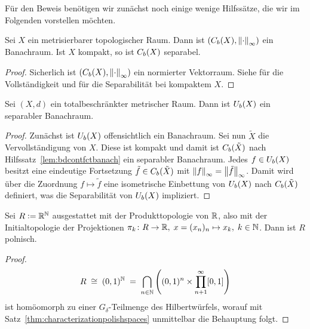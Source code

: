 \documentclass[../main/main.tex]{subfiles}
\begin{document}
	Für den Beweis benötigen wir zunächst noch einige wenige Hilfssätze, die wir im Folgenden vorstellen möchten.
	
	\begin{Hilfssatz}
		\label{lem:bdcontfctbanach}
		Sei $X$ ein metrisierbarer topologischer Raum. Dann ist $(C_b(X), \left\lVert\cdot\right\rVert_\infty)$ ein Banachraum. Ist $X$ kompakt, so ist $C_b(X)$ separabel.
	\end{Hilfssatz}

	\begin{proof}
		Sicherlich ist $(C_b(X), \left\lVert\cdot\right\rVert_\infty)$ ein normierter Vektorraum. Siehe \cite[Satz 2.1.6]{Simon.2015} für die Vollständigkeit und
		\cite[Satz 2.3.7]{Simon.2015} für die Separabilität bei kompaktem $X$.
	\end{proof}
	
	\begin{Hilfssatz}
		\label{lem:bduniffctbanach}
		Sei $(X, d)$ ein totalbeschränkter metrischer Raum. Dann ist $U_b(X)$ ein separabler Banachraum.
	\end{Hilfssatz}
	
	\begin{proof}
		Zunächst ist $U_b(X)$ offensichtlich ein Banachraum.
		Sei nun $\tilde{X}$ die Vervollständigung von $X$. Diese ist kompakt und damit ist $C_b(\tilde{X})$ nach Hilfssatz~\ref{lem:bdcontfctbanach} ein separabler Banachraum.
		Jedes $f \in U_b(X)$ besitzt eine eindeutige Fortsetzung $\tilde{f} \in C_b(\tilde{X})$ mit $\left\lVert f\right\rVert_\infty = \left\lVert\tilde{f}\right\rVert_\infty$. Damit wird über die Zuordnung
		$f \mapsto \tilde{f}$ eine isometrische Einbettung von $U_b(X)$ nach $C_b(\tilde{X})$ definiert, was die Separabilität von $U_b(X)$ impliziert.
	\end{proof}
	
	\begin{Hilfssatz}
		\label{lem:R}
		Sei $R \vcentcolon = \mathbb{R}^{\mathbb{N}}$ ausgestattet mit der Produkttopologie von $\mathbb{R}$, also mit der Initialtopologie der Projektionen $\pi_k \colon R \to \mathbb{R}, \; x = (x_n)_n \mapsto x_k , \; k \in \mathbb{N}$. Dann ist $R$ 
		polnisch.
	\end{Hilfssatz}
	
	\begin{proof}
		\[R \; \cong \; (0, 1)^{\mathbb{N}} \; = \; \bigcap_{n \in \mathbb{N}}  \left( (0, 1)^n \times \prod_{n+1}^{\infty} [0,1] \right) \]
		ist homöomorph zu einer $G_\delta$-Teilmenge des Hilbertwürfels, worauf mit Satz~\ref{thm:characterizationpolishspaces} unmittelbar die Behauptung folgt.
	\end{proof}
\end{document}
